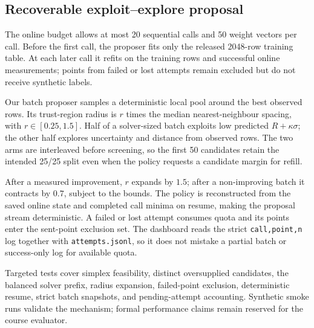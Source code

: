 \subsection{Recoverable exploit--explore proposal}
\label{sec:azq-strategy}

The online budget allows at most 20 sequential calls and 50 weight vectors per call. Before the first call, the proposer fits only the released 2048-row training table. At each later call it refits on the training rows and successful online measurements; points from failed or lost attempts remain excluded but do not receive synthetic labels.

Our batch proposer samples a deterministic local pool around the best observed rows. Its trust-region radius is $r$ times the median nearest-neighbour spacing, with $r\in[0.25,1.5]$. Half of a solver-sized batch exploits low predicted $R+\kappa\sigma$; the other half explores uncertainty and distance from observed rows. The two arms are interleaved before screening, so the first 50 candidates retain the intended 25/25 split even when the policy requests a candidate margin for refill.

After a measured improvement, $r$ expands by $1.5$; after a non-improving batch it contracts by $0.7$, subject to the bounds. The policy is reconstructed from the saved online state and completed call minima on resume, making the proposal stream deterministic. A failed or lost attempt consumes quota and its points enter the sent-point exclusion set. The dashboard reads the strict \texttt{call,point,n} log together with \texttt{attempts.jsonl}, so it does not mistake a partial batch or success-only log for available quota.

Targeted tests cover simplex feasibility, distinct oversupplied candidates, the balanced solver prefix, radius expansion, failed-point exclusion, deterministic resume, strict batch snapshots, and pending-attempt accounting. Synthetic smoke runs validate the mechanism; formal performance claims remain reserved for the course evaluator.
